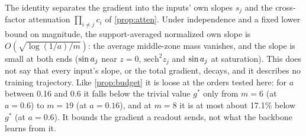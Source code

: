 The identity separates the gradient into the inputs' own slopes $s_j$ and the cross-factor attenuation
$\prod_{i\ne j}c_i$ of \cref{prop:atten}. Under independence and a fixed lower bound on magnitude, the support-averaged normalized own slope is $O(\sqrt{\log(1/a)/m})$: the average middle-zone mass vanishes, and the slope is small at both ends ($\sin a_{j}$ near $z=0$, $\mathrm{sech}^2z_j$ and $\sin a_{j}$ at saturation). This does not say that every input's slope, or the total gradient, decays, and it describes no training trajectory. Like \cref{prop:budget} it is loose at the orders tested here: for $a$ between 0.16
and 0.6 it falls below the trivial value $g^*$ only from $m=6$ (at $a=0.6$) to $m=19$ (at $a=0.16$), and at $m=8$ it is at most about 17.1\% below $g^*$ (at $a=0.6$). It bounds
the gradient a readout sends, not what the backbone learns from it.

